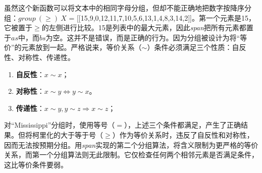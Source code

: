 \documentclass[b5paper]{ctexart}
\begin{document}
\be
{}
\ee

虽然这个新函数可以将文本中的相同字母分组，但却不能正确地把数字按降序分组：$\textit{group}\ (\geq)\ X$ = [[15,9,0,12,11,7,10,5,6,13,1,4,8,3,14,2]]。第一个元素是15，它被置于$\geq$的左侧进行比较。15是列表中的最大元素，因此\textit{span}把所有元素都置于$as$中，而$bs$为空。这并不是错误，而是正确的行为。因为分组被设计为将“等价”的元素放到一起。严格说来，等价关系（$\sim$）条件必须满足三个性质：自反性、对称性、传递性。

\begin{enumerate}
\item \textbf{自反性}：$x \sim x$；
\item \textbf{对称性}：$x \sim y \Leftrightarrow y \sim x$。
\item \textbf{传递性}：$x \sim y, y \sim z \Rightarrow x \sim z$；
\end{enumerate}

对``Mississippi''分组时，使用等号（$=$），上述三个条件都满足，产生了正确结果。但将柯里化的大于等于号（$\geq$）作为等价关系时，违反了自反性和对称性，因而无法按预期分组。用\textit{span}实现的第二个分组算法，将含义限制为更严格的等价关系，而第一个分组算法则无此限制。它仅检查任何两个相邻元素是否满足条件，这比等价条件要弱。

\begin{Exercise}[label={ex:list-take-drop}]
\end{Exercise}
\end{document}
